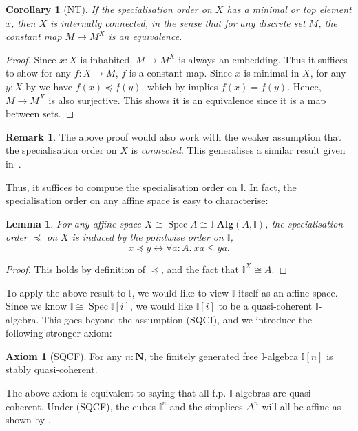 \documentclass[12pt]{amsart}
\newtheorem{lemma}[theorem]{Lemma}
\newtheorem{corollary}[theorem]{Corollary}
\theoremstyle{definition}
\newtheorem{remark}[theorem]{Remark}
\newtheorem*{axiom}{Axiom}
\newcommand{\mb}[1]{\mathbf{#1}}
\newcommand{\mbb}[1]{\mathbb{#1}}
\newcommand{\I}{\mbb I}
\newcommand{\alg}{\text{-}\mb{Alg}}
\newcommand{\N}{\mb N}
\newcommand{\fa}[2]{\forall #1\!\colon\!\!#2.\ }
\newcommand{\eq}{\leftrightarrow}
\newcommand{\spec}{\operatorname{Spec}}
\begin{document}
\begin{corollary}[NT]\label{cor:connectedpreservediscrete}
  If the specialisation order on $X$ has a minimal or top element $x$, then $X$ is internally connected, in the sense that for any discrete set $M$, the constant map $M \to M^X$ is an equivalence.
\end{corollary}
\begin{proof}
  Since $x:X$ is inhabited, $M \to M^X$ is always an embedding. Thus it suffices to show for any $f : X \to M$, $f$ is a constant map. Since $x$ is minimal in $X$, for any $y:X$ by  we have $f(x) \preceq f(y)$, which by  implies $f(x) = f(y)$. Hence, $M \to M^X$ is also surjective. This shows it is an equivalence since it is a map between sets.
\end{proof}

\begin{remark}
  The above proof would also work with the weaker assumption that the specialisation order on $X$ is \emph{connected}. This generalises a similar result given in~\cite[Prop. 4.4.1]{hyland2006first}.
\end{remark}

Thus, it suffices to compute the specialisation order on $\I$. In fact, the specialisation order on any affine space is easy to characterise:

\begin{lemma}\label{lem:specorderofaffine}
  For any affine space $X \cong \spec A \cong \I\alg(A,\I)$, the specialisation order $\preceq$ on $X$ is induced by the pointwise order on $\I$,
  \[ x \preceq y \eq \fa aA xa \le ya. \]
\end{lemma}
\begin{proof}
  This holds by definition of $\preceq$, and the fact that $\I^X \cong A$.
\end{proof}

To apply the above result to $\I$, we would like to view $\I$ itself as an affine space. Since we know $\I \cong \spec\I[i]$, we would like $\I[i]$ to be a quasi-coherent $\I$-algebra. This goes beyond the assumption (SQCI), and we introduce the following stronger axiom:

\begin{axiom}[SQCF]
  For any $n : \N$, the finitely generated free $\I$-algebra $\I[n]$ is stably quasi-coherent. 
\end{axiom}

The above axiom is equivalent to saying that all f.p. $\I$-algebras are quasi-coherent. Under (SQCF), the cubes $\I^n$ and the simplices $\Delta^n$ will all be affine as shown by .
\end{document}
